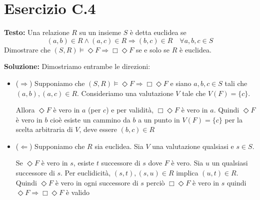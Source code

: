 \documentclass[a4paper,12pt]{article}
\newcommand{\esercizio}[2]{%
    \textbf{Testo:}
    #1
    
    \vspace{1.5em}
    
    \textbf{Soluzione:}
    #2
}
\begin{document}
\section*{Esercizio C.4}
\esercizio{%
    Una relazione $R$ su un insieme $S$ è detta euclidea se
    \[
        (a, b) \in R \land (a, c) \in R \Rightarrow (b, c) \in R \quad \forall a, b, c \in S
    \]
    Dimostrare che $(S, R) \models \Diamond F \Rightarrow \Box\Diamond F$ se e solo se $R$ è euclidea.
}{%
    Dimostriamo entrambe le direzioni:

    \begin{itemize}
        \item  ($\Rightarrow$) Supponiamo che $(S,R) \models \Diamond F \Rightarrow \Box\Diamond F$ e siano $a,b,c \in S$ tali che $(a,b), (a,c) \in R$. Consideriamo una valutazione $V$ tale che $V(F) = \{c\}$.

              Allora $\Diamond F$ è vero in $a$ (per $c$) e per validità, $\Box\Diamond F$ è vero in $a$. Quindi $\Diamond F$ è vero in $b$
              cioè esiste un cammino da $b$ a un punto in $V(F) = \{c\}$ per la scelta arbitraria di $V$, deve essere $(b,c) \in R$

        \item ($\Leftarrow$) Supponiamo che $R$ sia euclidea. Sia $V$ una valutazione qualsiasi e $s \in S$.

              Se $\Diamond F$ è vero in $s$, esiste $t$ successore di $s$ dove $F$ è vero. Sia $u$ un qualsiasi successore di $s$. Per euclidicità, $(s,t), (s,u) \in R$ implica $(u,t) \in R$. Quindi $\Diamond F$ è vero in ogni successore di $s$ perciò $\Box\Diamond F$ è vero in $s$ quindi $\Diamond F \Rightarrow \Box\Diamond F$ è valido
    \end{itemize}
}
\end{document}
